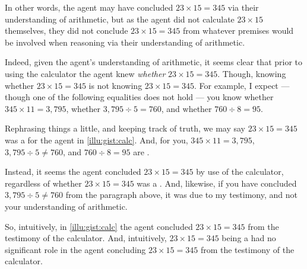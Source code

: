 \begin{note}
  In other words, the agent may have concluded \(23 \times 15 = 345\) via their understanding of arithmetic, but as the agent did not calculate \(23 \times 15\) themselves, they did not conclude \(23 \times 15 = 345\) from whatever premises would be involved when reasoning via their understanding of arithmetic.

  Indeed, given the agent's understanding of arithmetic, it seems clear that prior to using the calculator the agent knew \emph{whether} \(23 \times 15 = 345\).
  Though, knowing whether \(23 \times 15 = 345\) is not knowing \(23 \times 15 = 345\).
  For example, I expect --- though one of the following equalities does not hold --- you know whether \(345 \times 11 = 3,795\), whether \(3,795 \div 5 = 760\), and whether \(760 \div 8 = 95\).

  Rephrasing things a little, and keeping track of truth, we may say \(23 \times 15 = 345\) was a \fc{} for the agent in \autoref{illu:gist:calc}.
  And, for you, \(345 \times 11 = 3,795\), \(3,795 \div 5 \ne 760\), and \(760 \div 8 = 95\) are .

  Instead, it seems the agent concluded \(23 \times 15 = 345\) by use of the calculator, regardless of whether \(23 \times 15 = 345\) was a .
  And, likewise, if you have concluded \(3,795 \div 5 \ne 760\) from the paragraph above, it was due to my testimony, and not your understanding of arithmetic.
\end{note}

\begin{note}
  So, intuitively, in \autoref{illu:gist:calc} the agent concluded \(23 \times 15 = 345\) from the testimony of the calculator.
  And, intuitively, \(23 \times 15 = 345\) being a  had no significant role in the agent concluding \(23 \times 15 = 345\) from the testimony of the calculator.
\end{note}

